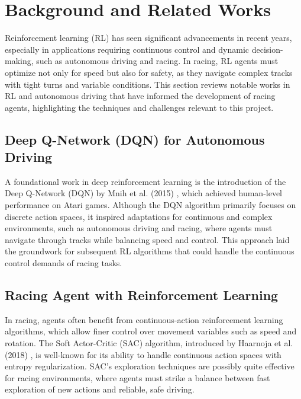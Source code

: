 \documentclass{article}
\begin{document}
\section{Background and Related Works}

Reinforcement learning (RL) has seen significant advancements in recent years, especially in applications requiring continuous control and dynamic decision-making, such as autonomous driving and racing. In racing, RL agents must optimize not only for speed but also for safety, as they navigate complex tracks with tight turns and variable conditions. This section reviews notable works in RL and autonomous driving that have informed the development of racing agents, highlighting the techniques and challenges relevant to this project.

\subsection{Deep Q-Network (DQN) for Autonomous Driving}
A foundational work in deep reinforcement learning is the introduction of the Deep Q-Network (DQN) by Mnih et al. (2015) \cite{mnih2015human}, which achieved human-level performance on Atari games. Although the DQN algorithm primarily focuses on discrete action spaces, it inspired adaptations for continuous and complex environments, such as autonomous driving and racing, where agents must navigate through tracks while balancing speed and control. This approach laid the groundwork for subsequent RL algorithms that could handle the continuous control demands of racing tasks.

\subsection{Racing Agent with Reinforcement Learning}
In racing, agents often benefit from continuous-action reinforcement learning algorithms, which allow finer control over movement variables such as speed and rotation. The Soft Actor-Critic (SAC) algorithm, introduced by Haarnoja et al. (2018) \cite{haarnoja2018soft}, is well-known for its ability to handle continuous action spaces with entropy regularization. SAC’s exploration techniques are possibly quite effective for racing environments, where agents must strike a balance between fast exploration of new actions and reliable, safe driving.
\end{document}
